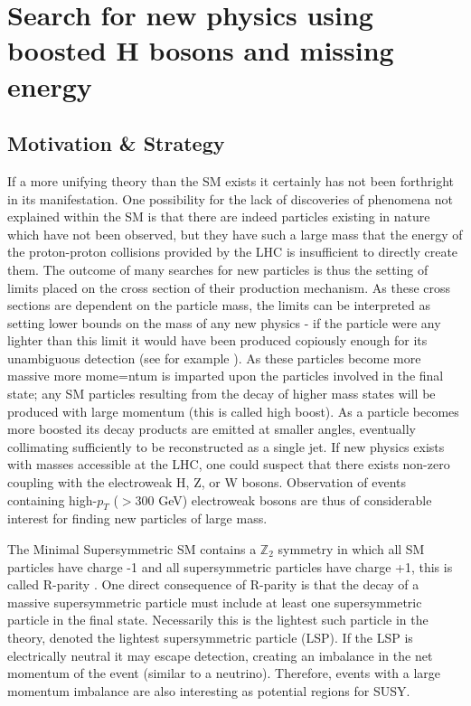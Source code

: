 \newcommand{\ttbar}{$\textrm{t}\bar{\textrm{t}}~$}
\newcommand{\bbbar}{$\textrm{b}\bar{\textrm{b}}~$}
\newcommand{\ptmiss}{$p_{T}^{\mathrm{miss}}~$}

\chapter{Search for new physics using boosted H bosons and missing energy}
\label{chap:analysis}

\section{Motivation \& Strategy}

If a more unifying theory than the SM exists it certainly has not been forthright in its manifestation. One possibility for the lack of discoveries of phenomena not explained within the SM is that there are indeed particles existing in nature which have not been observed, but they have such a large mass that the energy of the proton-proton collisions provided by the LHC is insufficient to directly create them. The outcome of many searches for new particles is thus the setting of limits placed on the cross section of their production mechanism. As these cross sections are dependent on the particle mass, the limits can be interpreted as setting lower bounds on the mass of any new physics - if the particle were any lighter than this limit it would have been produced copiously enough for its unambiguous detection (see for example \cite{CMS-SUS-16-033, CMS-SUS-15-002}). As these particles become more massive more mome=ntum is imparted upon the particles involved in the final state; any SM particles resulting from the decay of higher mass states will be produced with large momentum (this is called high boost). As a particle becomes more boosted its decay products are emitted at smaller angles, eventually collimating sufficiently to be reconstructed as a single jet. If new physics exists with masses accessible at the LHC, one could suspect that there exists non-zero coupling with the electroweak H, Z, or W bosons. Observation of events containing high-$p_{T}$ ($>$300 GeV) electroweak bosons are thus of considerable interest for finding new particles of large mass.

The Minimal Supersymmetric SM contains a $\mathbb{Z}_{2}$ symmetry in which all SM particles have charge -1 and all supersymmetric particles have charge +1, this is called R-parity \cite{susyprimer}. One direct consequence of R-parity is that the decay of a massive supersymmetric particle must include at least one supersymmetric particle in the final state. Necessarily this is the lightest such particle in the theory, denoted the lightest supersymmetric particle (LSP). If the LSP is electrically neutral it may escape detection, creating an imbalance in the net momentum of the event (similar to a neutrino). Therefore, events with a large momentum imbalance are also interesting as potential regions for SUSY.

